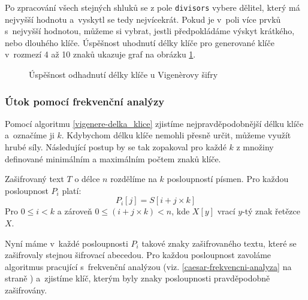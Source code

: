 \documentclass[glossaries, index]{kidiplom}
\begin{document}
Po zpracování všech stejných shluků se z pole \texttt{divisors} vybere dělitel, který má nejvyšší hodnotu a~vyskytl se tedy nejvícekrát. Pokud je v~poli více prvků s~nejvyšší hodnotou, můžeme si vybrat, jestli předpokládáme výskyt krátkého, nebo dlouhého klíče. Úspěšnost uhodnutí délky klíče pro generované klíče v~rozmezí 4 až 10 znaků ukazuje graf na obrázku \ref{vigenere-key-length}.

\begin{figure}[htbp]
\centering
{}
\caption{Úspěšnost odhadnutí délky klíče u Vigenèrovy šifry}
\label{vigenere-key-length}
\end{figure}

\subsubsection{Útok pomocí frekvenční analýzy}
Pomocí algoritmu \ref{vigenere-delka_klice} zjistíme nejpravděpodobnější délku klíče a~označíme ji $k$. Kdybychom délku klíče nemohli přesně určit, můžeme využít hrubé síly. Následující postup by se tak zopakoval pro každé $k$ z množiny definované minimálním a maximálním počtem znaků klíče.

Zašifrovaný text $T$ o délce $n$ rozdělíme na $k$ posloupností písmen. Pro každou posloupnost $P_{i}$ platí:
$$P_{i}[j] = S[i+j\times k]$$
\noindent
Pro $0 \leq i < k$ a zároveň $0 \leq (i+j\times k) < n$, kde $X[y]$ vrací $y$-tý znak řetězce $X$.

Nyní máme v~každé posloupnosti $P_{i}$ takové znaky zašifrovaného textu, které se zašifrovaly stejnou šifrovací abecedou. Pro každou posloupnost zavoláme algoritmus pracující s~frekvenční analýzou (viz. \ref{caesar-frekvencni-analyza} na straně \pageref{caesar-frekvencni-analyza}) a~zjistíme klíč, kterým byly znaky posloupnosti pravděpodobně zašifrovány. 
\end{document}
